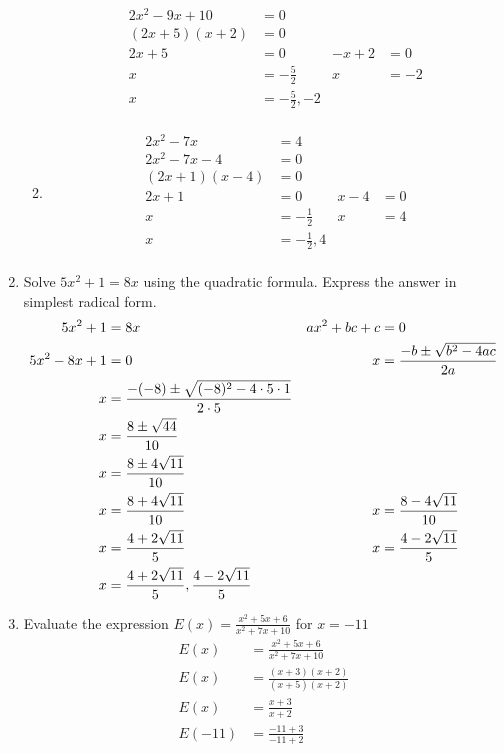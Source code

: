 \documentclass[paper=a4, fontsize=11pt]{scrartcl}
\begin{document}
\begin{enumerate}
\begin{enumerate}
\begin{align*}
            2x^2-9x+10&=0\\
            (2x+5)(x+2)&=0\\
            2x+5&=0&-x+2&=0\\
            x&=-\frac{5}{2}&x&=-2\\
            x&=-\frac{5}{2},-2\\
        \end{align*}
        \item \begin{align*}
            2x^2-7x&=4\\
            2x^2-7x-4&=0\\
            (2x+1)(x-4)&=0\\
            2x+1&=0&x-4&=0\\
            x&=-\frac{1}{2}&x&=4\\
            x&=-\frac{1}{2},4\\
        \end{align*}
    \end{enumerate}
    \item Solve $5x^2+1=8x$ using the quadratic formula. Express the answer in simplest radical form.
    \begin{align*}
        5x^2+1&=8x&ax^2+bc+c&=0\\
        5x^2-8x+1&=0&x&=\frac{-b\pm\sqrt{b^2-4ac}}{2a}\\\index{Quadratic Formula!$x=\frac{-b\pm\sqrt{b^2-4ac}}{2a}$}
        x&=\frac{-(-8)\pm\sqrt{(-8)^2-4\cdot 5\cdot 1}}{2\cdot 5}\\
        x&=\frac{8\pm\sqrt{44}}{10}\\
        x&=\frac{8\pm4\sqrt{11}}{10}\\
        x&=\frac{8+4\sqrt{11}}{10}&x&=\frac{8-4\sqrt{11}}{10}\\
        x&=\frac{4+2\sqrt{11}}{5}&x&=\frac{4-2\sqrt{11}}{5}\\
        x&=\frac{4+2\sqrt{11}}{5},\frac{4-2\sqrt{11}}{5}\\
    \end{align*}
    \item Evaluate the expression $E(x)=\frac{x^2+5x+6}{x^2+7x+10}$ for $x=-11$
    \begin{align*}
        E(x)&=\frac{x^2+5x+6}{x^2+7x+10}\\
        E(x)&=\frac{(x+3)(x+2)}{(x+5)(x+2)}\\
        E(x)&=\frac{x+3}{x+2}\\
        E(-11)&=\frac{-11+3}{-11+2}\\

\end{align*}
\end{enumerate}
\end{document}

